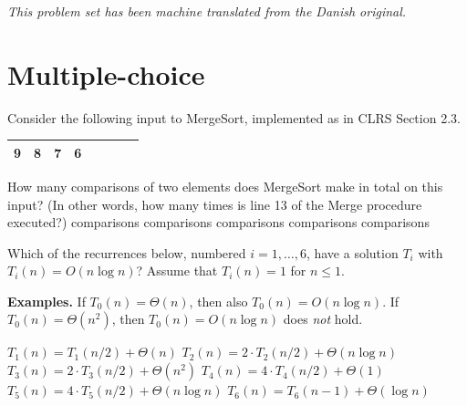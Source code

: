 \noindent\emph{This problem set has been machine translated from the Danish original.}
\medskip

\section*{Multiple-choice}\label{sec:mc}


\multiplechoicestart


Consider the following input to {\sc MergeSort}, implemented as in CLRS Section 2.3.
\begin{center}
\begin{tabular}{|c|c|c|c|c|c|c|c|}
\hline
9 & 8 & 7 & 6\\
\hline
\end{tabular}
\end{center}
How many comparisons of two elements does {\sc MergeSort} make in total on this input?
(In other words, how many times is line 13 of the {\sc Merge} procedure executed?)
\oneanswer
\optionsstart
{} comparisons
 comparisons \correct
{} comparisons
 comparisons
 comparisons
\optionsend
{}



Which of the recurrences below, numbered $i=1,\dots,6$, have a solution $T_i$ with $T_i(n) = O(n \log n)$?
Assume that $T_i(n) = 1$ for $n\leq 1$. \multipleanswers

\medskip\noindent
{\bf Examples.} If $T_0(n) = \Theta(n)$, then also $T_0(n) = O(n \log n)$. If $T_0(n) = \Theta(n^2)$, then $T_0(n) = O(n \log n)$ does \emph{not} hold.

\optionsstart
\answer $T_1(n) = T_1(n/2) + \Theta(n)$ \correct
\answer $T_2(n) = 2\cdot T_2(n/2) + \Theta(n \log n)$
\answer $T_3(n) = 2\cdot T_3(n/2) + \Theta(n^2)$
\answer $T_4(n) = 4\cdot T_4(n/2) + \Theta(1)$
\answer $T_5(n) = 4\cdot T_5(n/2) + \Theta(n \log n)$
\answer $T_6(n) = T_6(n-1) + \Theta(\log n)$ \correct
\optionsend

